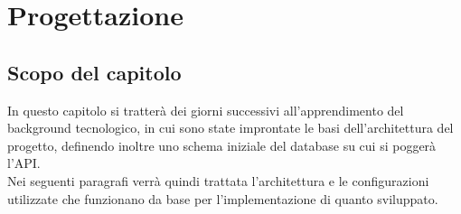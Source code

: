 \chapter{Progettazione}
\label{cap:progettazione}

\section{Scopo del capitolo}
In questo capitolo si tratterà dei giorni successivi all'apprendimento del background tecnologico, in cui sono state improntate le basi dell'architettura del progetto, definendo inoltre uno schema iniziale del database su cui si poggerà l'API.\\
Nei seguenti paragrafi verrà quindi trattata l'architettura e le configurazioni utilizzate che funzionano da base per l'implementazione di quanto sviluppato.\\













